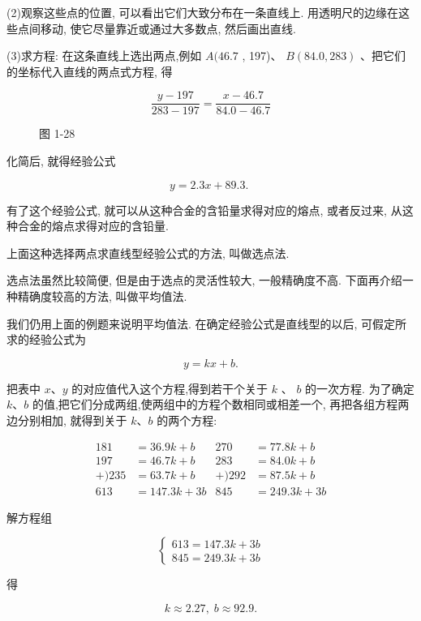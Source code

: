 \documentclass[lang=cn,newtx,12pt,scheme=chinese]{elegantbook}
\begin{document}
(2)观察这些点的位置, 可以看出它们大致分布在一条直线上. 用透明尺的边缘在这些点间移动, 使它尽量靠近或通过大多数点, 然后画出直线.

(3)求方程: 在这条直线上选出两点,例如 \(A({46.7}\) , 197)、 \(B\left( {{84.0},{283}}\right)\) 、把它们的坐标代入直线的两点式方程, 得

\[
  \frac{y - {197}}{{283} - {197}} = \frac{x - {46.7}}{{84.0} - {46.7}}
\]

\begin{figure}[h]
  \centering
  
  \caption{图 1-28}
\end{figure}

化简后, 就得经验公式

\[
  y = {2.3x} + {89.3}\text{. }
\]

有了这个经验公式, 就可以从这种合金的含铅量求得对应的熔点, 或者反过来, 从这种合金的熔点求得对应的含铅量.

上面这种选择两点求直线型经验公式的方法, 叫做选点法.

选点法虽然比较简便, 但是由于选点的灵活性较大, 一般精确度不高. 下面再介绍一种精确度较高的方法, 叫做平均值法.

我们仍用上面的例题来说明平均值法. 在确定经验公式是直线型的以后, 可假定所求的经验公式为

\[
  y = {kx} + b.
\]

把表中 \(x\text{、}y\) 的对应值代入这个方程,得到若干个关于 \(k\) 、 \(b\) 的一次方程. 为了确定 \(k\text{、}b\) 的值,把它们分成两组,使两组中的方程个数相同或相差一个, 再把各组方程两边分别相加, 就得到关于 \(k\text{、}b\) 的两个方程:

\[
  \begin{aligned} {181} & = {36.9k} + b & {270} & = {77.8k} + b \\ {197} & = {46.7k} + b & {283} & = {84.0k} + b \\ + ){235} & = {63.7k} + b & + ){292} & = {87.5k} + b \\ {613} & = {147.3k} + {3b} & {845} & = {249.3k} + {3b} \end{aligned}
\]

解方程组

\[
  \left\{ \begin{array}{l} {613} = {147.3k} + {3b} \\ {845} = {249.3k} + {3b} \end{array}\right.
\]

得

\[
  k \approx {2.27},\;b \approx {92.9}.
\]
\end{document}

